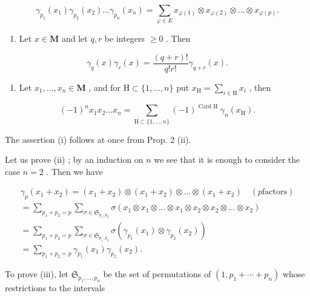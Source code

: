 \[
\gamma_ {p _ {1}} (x _ {1}) \gamma_ {p _ {2}} (x _ {2}) \dots \gamma_ {p _ {n}} (x _ {n}) = \sum_ {\varphi \in E} x _ {\varphi (1)} \otimes x _ {\varphi (2)} \otimes \dots \otimes x _ {\varphi (p)}.
\]

\begin{enumerate}
\def\labelenumi{(\roman{enumi})}
\setcounter{enumi}{3}
\tightlist
\item
  Let \(x \in \mathbf{M}\) and let \(q, r\) be integers \(\geqslant 0\) . Then
\end{enumerate}

\[
\gamma_ {q} (x) \gamma_ {r} (x) = \frac {(q + r) !}{q ! r !} \gamma_ {q + r} (x).
\]

\begin{enumerate}
\def\labelenumi{(\alph{enumi})}
\setcounter{enumi}{21}
\tightlist
\item
  Let \(x_{1}, \ldots, x_{n} \in \mathbf{M}\) , and for \(\mathrm{H} \subset \{1, \ldots, n\}\) put \(x_{\mathrm{H}} = \sum_{i \in \mathrm{H}} x_{i}\) , then
\end{enumerate}

\[
(- 1) ^ {n} x _ {1} x _ {2} \dots x _ {n} = \sum_ {\mathrm{H} \subset \{1, \dots , n \}} (- 1) ^ {\text { Card   H }} \gamma_ {n} (x _ {\mathrm{H}}).
\]

The assertion (i) follows at once from Prop. 2 (ii).

Let us prove (ii) ; by an induction on \(n\) we see that it is enough to consider the case \(n = 2\) . Then we have

\[
\begin{array}{l} \gamma_ {p} (x _ {1} + x _ {2}) = (x _ {1} + x _ {2}) \otimes (x _ {1} + x _ {2}) \otimes \dots \otimes (x _ {1} + x _ {2}) \quad (p \text {factors}) \\ = \sum_ {p _ {1} + p _ {2} = p} \sum_ {\sigma \in \mathfrak {S} _ {p _ {1}, p _ {2}}} \sigma (x _ {1} \otimes x _ {1} \otimes \dots \otimes x _ {1} \otimes x _ {2} \otimes x _ {2} \otimes \dots \otimes x _ {2}) \\ = \sum_ {p _ {1} + p _ {2} = p} \sum_ {\sigma \in \mathfrak {S} _ {p _ {1}, p _ {2}}} \sigma (\gamma_ {p _ {1}} (x _ {1}) \otimes \gamma_ {p _ {2}} (x _ {2})) \\ = \sum_ {p _ {1} + p _ {2} = p} \gamma_ {p _ {1}} (x _ {1}) \gamma_ {p _ {2}} (x _ {2}). \end{array}
\]

To prove (iii), let \(\mathfrak{S}_{p_{1},\ldots,p_{n}}\) be the set of permutations of \((1,p_{1}+\cdots+p_{n})\) whose restrictions to the intervals


